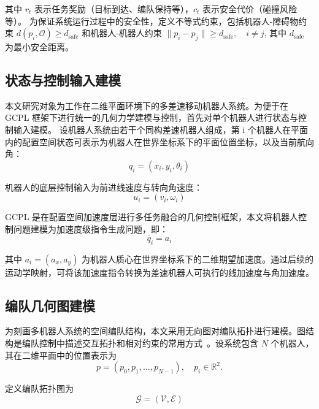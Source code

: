其中 $r_t$ 表示任务奖励（目标到达、编队保持等），$c_t$ 表示安全代价（碰撞风险等）。
为保证系统运行过程中的安全性，定义不等式约束，包括机器人-障碍物约束
$d(p_i, \mathcal{O}) \ge d_{\text{safe}}$
和机器人-机器人约束
$\|p_i - p_j\| \ge d_{\text{safe}}, \quad i \ne j$,
其中 $d_{\text{safe}}$ 为最小安全距离。

\subsection{状态与控制输入建模}
本文研究对象为工作在二维平面环境下的多差速移动机器人系统。为便于在 GCPL 框架下进行统一的几何力学建模与控制，首先对单个机器人进行状态与控制输入建模。
设机器人系统由若干个同构差速机器人组成，第 i 个机器人在平面内的配置空间状态可表示为机器人在世界坐标系下的平面位置坐标，以及当前航向角：
\begin{equation}
    q_i = (x_i,y_i,\theta_i)
\end{equation}

机器人的底层控制输入为前进线速度与转向角速度：
\begin{equation}
    u_i=(v_i,\omega_i)
\end{equation}

GCPL 是在配置空间加速度层进行多任务融合的几何控制框架，本文将机器人控制问题建模为加速度级指令生成问题，即：
\begin{equation}
    \ddot{q_i} = a_i
\end{equation}

其中 $a_i = (a_x, a_y)$ 为机器人质心在世界坐标系下的二维期望加速度。通过后续的运动学映射，可将该加速度指令转换为差速机器人可执行的线加速度与角加速度。

\subsection{编队几何图建模}

为刻画多机器人系统的空间编队结构，本文采用无向图对编队拓扑进行建模。图结构是编队控制中描述交互拓扑和相对约束的常用方式~\cite{oh2015formation_survey,golmisheh2023distributed_safe_formation}。设系统包含 $N$ 个机器人，其在二维平面中的位置表示为
\begin{equation}
    p = (p_0, p_1, \ldots, p_{N-1}), \quad p_i \in \mathbb{R}^2.
\end{equation}

定义编队拓扑图为
\begin{equation}
    \mathcal{G} = (\mathcal{V}, \mathcal{E})
\end{equation}

